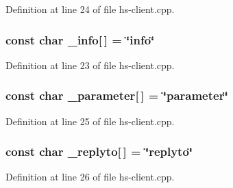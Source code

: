 Definition at line 24 of file hs-\/client.\+cpp.

\subsubsection[{\texorpdfstring{\+\_\+info}{_info}}]{\setlength{\rightskip}{0pt plus 5cm}const char \+\_\+info\mbox{[}$\,$\mbox{]} = \char`\"{}info\char`\"{}\hspace{0.3cm}{\ttfamily [static]}}\hypertarget{hs-client_8cpp_ae125cd80cb98582684636e46ecf33cac}{}\label{hs-client_8cpp_ae125cd80cb98582684636e46ecf33cac}


Definition at line 23 of file hs-\/client.\+cpp.

\subsubsection[{\texorpdfstring{\+\_\+parameter}{_parameter}}]{\setlength{\rightskip}{0pt plus 5cm}const char \+\_\+parameter\mbox{[}$\,$\mbox{]} = \char`\"{}parameter\char`\"{}\hspace{0.3cm}{\ttfamily [static]}}\hypertarget{hs-client_8cpp_ae3fc16098a2461f2f1ae0ac8561437c6}{}\label{hs-client_8cpp_ae3fc16098a2461f2f1ae0ac8561437c6}


Definition at line 25 of file hs-\/client.\+cpp.

\subsubsection[{\texorpdfstring{\+\_\+replyto}{_replyto}}]{\setlength{\rightskip}{0pt plus 5cm}const char \+\_\+replyto\mbox{[}$\,$\mbox{]} = \char`\"{}replyto\char`\"{}\hspace{0.3cm}{\ttfamily [static]}}\hypertarget{hs-client_8cpp_ac5b722c0d87d2b0e3dfc527b44a1f5db}{}\label{hs-client_8cpp_ac5b722c0d87d2b0e3dfc527b44a1f5db}


Definition at line 26 of file hs-\/client.\+cpp.


